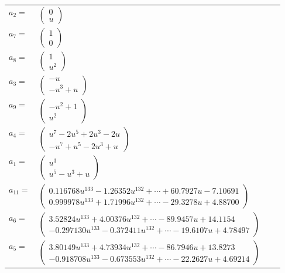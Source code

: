 \documentclass[1p]{elsarticle_modified}
\theoremstyle{definition}
\begin{document}
\begin{tabular}{m{7pt} m{180pt} m{7pt} m{180pt} }
\flushright $a_{2}=$&$\begin{pmatrix}0\\u\end{pmatrix}$ \\
\flushright $a_{7}=$&$\begin{pmatrix}1\\0\end{pmatrix}$ \\
\flushright $a_{8}=$&$\begin{pmatrix}1\\u^2\end{pmatrix}$ \\
\flushright $a_{3}=$&$\begin{pmatrix}- u\\- u^3+u\end{pmatrix}$ \\
\flushright $a_{9}=$&$\begin{pmatrix}- u^2+1\\u^2\end{pmatrix}$ \\
\flushright $a_{4}=$&$\begin{pmatrix}u^7-2 u^5+2 u^3-2 u\\- u^7+u^5-2 u^3+u\end{pmatrix}$ \\
\flushright $a_{1}=$&$\begin{pmatrix}u^3\\u^5- u^3+u\end{pmatrix}$ \\
\flushright $a_{11}=$&$\begin{pmatrix}0.116768 u^{133}-1.26352 u^{132}+\cdots+60.7927 u-7.10691\\0.999978 u^{133}+1.71996 u^{132}+\cdots-29.3278 u+4.88700\end{pmatrix}$ \\
\flushright $a_{6}=$&$\begin{pmatrix}3.52824 u^{133}+4.00376 u^{132}+\cdots-89.9457 u+14.1154\\-0.297130 u^{133}-0.372411 u^{132}+\cdots-19.6107 u+4.78497\end{pmatrix}$ \\
\flushright $a_{5}=$&$\begin{pmatrix}3.80149 u^{133}+4.73934 u^{132}+\cdots-86.7946 u+13.8273\\-0.918708 u^{133}-0.673553 u^{132}+\cdots-22.2627 u+4.69214\end{pmatrix}$ \\

\end{tabular}
\end{document}
